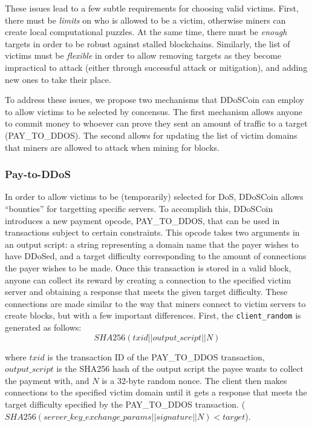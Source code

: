 These issues lead to a few subtle requirements for choosing valid victims.
First, there must be \emph{limits} on who is allowed to be a victim, otherwise
miners can create local computational puzzles. At the same time, there must be
\emph{enough} targets in order to be robust against stalled blockchains.
Similarly, the list of victims must be \emph{flexible} in order to allow
removing targets as they become impractical to attack (either
through successful attack or mitigation), and adding new ones to take their
place.

To address these issues, we propose two mechanisms that DDoSCoin can
employ to allow victims to be selected by concensus. The first mechanism allows
anyone to commit money to whoever can prove they sent an amount of traffic to a target
(PAY\_TO\_DDOS). The second allows for updating the list of victim domains that
miners are allowed to attack when mining for blocks.


\subsubsection{Pay-to-DDoS}

\label{sec:pay-to-ddos}

In order to allow victims to be (temporarily) selected for DoS, DDoSCoin allows
``bounties'' for targetting specific servers. To accomplish this, DDoSCoin
introduces a new payment opcode, PAY\_TO\_DDOS, that can be used in transactions
subject to certain constraints. This opcode takes two arguments in an output
script: a string representing a domain name that the payer wishes to have
DDoSed, and a target difficulty corresponding to the amount of connections the
payer wishes to be made. Once this transaction is stored in a valid block,
anyone can collect its reward by creating a connection to the specified victim
server and obtaining a response that meets the given target difficulty. These
connections are made similar to the way that miners connect to victim servers to
create blocks, but with a few important differences. First, the
\texttt{client\_random} is generated as follows:
\begin{equation}
SHA256(txid || output\_script || N)
\end{equation}

where $txid$ is the transaction ID of the PAY\_TO\_DDOS transaction,
$output\_script$ is the SHA256 hash of the output script the payee wants to collect the
payment with, and $N$ is a 32-byte random nonce.  The client then makes connections to the
specified victim domain until it gets a response that meets the target
difficulty specified by the PAY\_TO\_DDOS transaction.
($SHA256(server\_key\_exchange\_params || signature || N) < target$).

